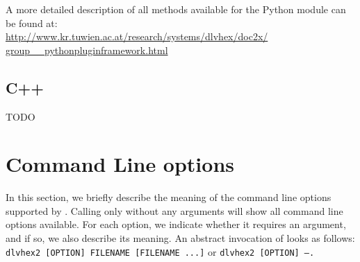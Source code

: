 \documentclass[a4paper, titlepage]{article}
\begin{document}
A more detailed description of all methods available for the \dlvhex{} Python module can be found at:\\ \url{http://www.kr.tuwien.ac.at/research/systems/dlvhex/doc2x/}\\
\url{group__pythonpluginframework.html}
\subsection{C++}
TODO

\section{Command Line options}
\label{sec:commandline}
In this section, we briefly describe the meaning of the command line options supported by \dlvhex{}. 
Calling only \dlvhex{} without any arguments will show all 
command line options available. For each option, we indicate whether it requires an argument, and if so, we also describe its meaning. An abstract invocation of \dlvhex{} looks as follows:\\
\texttt{dlvhex2 [OPTION] FILENAME [FILENAME ...]} or \texttt{dlvhex2 [OPTION] --.}
\end{document}
